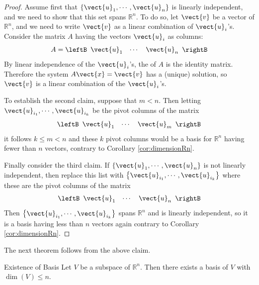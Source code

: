 \begin{proof}
Assume first that $\left\{ \vect{u}_{1},\cdots ,\vect{u}_{n}\right\} $
is linearly independent, and we need to show that this set spans
$\mathbb{R}^{n}$. To do so, let $\vect{v}$ be a vector of
$\mathbb{R}^{n}$, and we need to write $\vect{v}$ as a linear combination of $\vect{u}_i$'s. 
Consider the matrix $A$ having the vectors $\vect{u}_i$  as
columns:
\begin{equation*}
A = 
\leftB
\begin{array}{rrr}
\vect{u}_{1} & \cdots & \vect{u}_{n} 
\end{array}
\rightB
\end{equation*}
By linear independence of the $\vect{u}_i$'s, the \rref \;of $A$ is
the identity matrix.  Therefore the system $A\vect{x}=
\vect{v}$ has a (unique) solution, so $\vect{v}$ is a linear combination
of the $\vect{u}_i$'s.

To establish the second claim, suppose that $m<n.$ Then letting
$\vect{u}_{i_{1}},\cdots ,\vect{u}_{i_{k}}$ be the pivot columns of the
matrix
\begin{equation*}
\leftB
\begin{array}{ccc}
\vect{u}_{1} & \cdots & \vect{u}_{m}
\end{array}
\rightB
\end{equation*}
it follows $k\leq m<n$ and these $k$ pivot columns would be a basis
for $\mathbb{R}^{n}$ having fewer than $n$ vectors, contrary to
Corollary \ref{cor:dimensionRn}.

Finally consider the third claim. If $\left\{ \vect{u}_{1},\cdots
,\vect{u}_{n}\right\} $ is not linearly independent, then replace this
list with $\left\{ \vect{u}_{i_{1}},\cdots ,\vect{u}_{i_{k}}\right\} $ where these
are the pivot columns of the matrix 
\begin{equation*}
\leftB
\begin{array}{ccc}
\vect{u}_{1} & \cdots & \vect{u}_{n}
\end{array}
\rightB
\end{equation*}
Then $\left\{ \vect{u}_{i_{1}},\cdots ,\vect{u}_{i_{k}}\right\} $ spans
$\mathbb{R}^{n}$ and is linearly independent, so it is a basis having
less than $n$ vectors again contrary to Corollary \ref{cor:dimensionRn}.
\end{proof}

The next theorem follows from the above claim.

\begin{theorem}{Existence of Basis}\label{thm:existencebasis}
Let $V$ be a subspace of $\mathbb{R}^n$. Then there exists a basis of $V$ with 
 $\dim(V)\leq n$.
\end{theorem}

